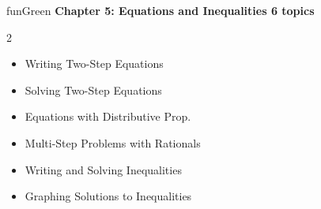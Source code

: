 {\vspace{2mm}

\begin{wbChapterStripe}{funGreen}
{\small\bfseries\color{black!80}Chapter 5: Equations and Inequalities%
\hfill\normalfont\color{black!50}6 topics}

\vspace{1mm}
\small
\begin{multicols}{2}
\begin{itemize}[leftmargin=4mm, itemsep=1pt, topsep=1pt]
    \item Writing Two-Step Equations
    \item Solving Two-Step Equations
    \item Equations with Distributive Prop.
    \item Multi-Step Problems with Rationals
    \item Writing and Solving Inequalities
    \item Graphing Solutions to Inequalities
\end{itemize}
\end{multicols}
\end{wbChapterStripe}

}

\clearpage

\thispagestyle{empty}

